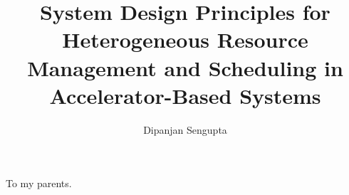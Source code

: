 \documentclass{gatech-thesis}
\title{System Design Principles for Heterogeneous Resource Management and Scheduling in Accelerator-Based Systems
}
\author{Dipanjan Sengupta}
\begin{document}


\begin{preliminary}
\begin{dedication}
\null\vfil
{\Large
\begin{center}
To my parents.
\end{center}}
\vfil\null
\end{dedication}

\begin{acknowledgements}

\end{acknowledgements}
\contents
%
\begin{summary}

\end{summary}
\end{preliminary}



%

%




%
%
%

\begin{postliminary}
\begin{vita}

\end{vita}
\end{postliminary}
\end{document}
